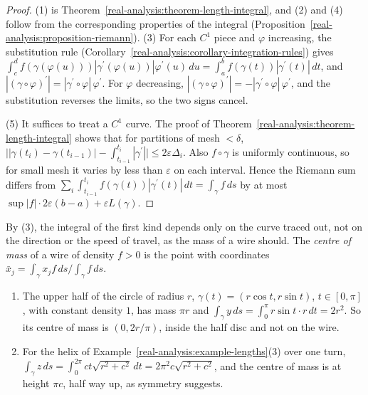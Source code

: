 \begin{proof}
(1) is Theorem~\ref{real-analysis:theorem-length-integral}, and (2) and (4) follow from the corresponding properties of the integral (Proposition~\ref{real-analysis:proposition-riemann}). (3) For each $C^1$ piece
and $\varphi$ increasing, the substitution rule (Corollary~\ref{real-analysis:corollary-integration-rules}) gives
$\int_c^df(\gamma(\varphi(u)))|\gamma^{\prime}(\varphi(u))|\varphi^{\prime}(u)\,du = \int_a^bf(\gamma(t))|\gamma^{\prime}(t)|\,dt$, and $|(\gamma \circ \varphi)^{\prime}| = |\gamma^{\prime} \circ \varphi|\,\varphi^{\prime}$. For $\varphi$ decreasing,
$|(\gamma \circ \varphi)^{\prime}| = -|\gamma^{\prime} \circ \varphi|\,\varphi^{\prime}$, and the substitution reverses the limits, so the two signs cancel.

(5) It suffices to treat a $C^1$ curve. The proof of Theorem~\ref{real-analysis:theorem-length-integral} shows that for partitions of mesh $< \delta$,
$\bigl||\gamma(t_i) - \gamma(t_{i-1})| - \int_{t_{i-1}}^{t_i}|\gamma^{\prime}|\bigr| \leq 2\varepsilon\Delta_i$. Also $f \circ \gamma$ is uniformly continuous, so for small mesh it varies by less than $\varepsilon$
on each interval. Hence the Riemann sum differs from $\sum_i\int_{t_{i-1}}^{t_i}f(\gamma(t))|\gamma^{\prime}(t)|\,dt = \int_\gamma f\,ds$ by at most $\sup|f| \cdot 2\varepsilon(b - a) + \varepsilon L(\gamma)$.
\end{proof}

By (3), the integral of the first kind depends only on the curve traced out, not on the direction or the speed of travel, as the mass of a wire should. The \emph{centre of mass} of a wire of density
$f > 0$ is the point with coordinates $\bar x_j = \int_\gamma x_jf\,ds / \int_\gamma f\,ds$.

\begin{example}\label{real-analysis:example-first-kind}
\begin{enumerate}
\item The upper half of the circle of radius $r$, $\gamma(t) = (r\cos t, r\sin t)$, $t \in [0, \pi]$, with constant density $1$, has mass $\pi r$ and
$\int_\gamma y\,ds = \int_0^\pi r\sin t \cdot r\,dt = 2r^2$. So its centre of mass is $(0, 2r/\pi)$, inside the half disc and not on the wire.
\item For the helix of Example~\ref{real-analysis:example-lengths}(3) over one turn, $\int_\gamma z\,ds = \int_0^{2\pi}ct\sqrt{r^2 + c^2}\,dt = 2\pi^2c\sqrt{r^2 + c^2}$, and the centre of mass is at height $\pi c$, half way up, as symmetry
suggests.
\end{enumerate}
\end{example}

